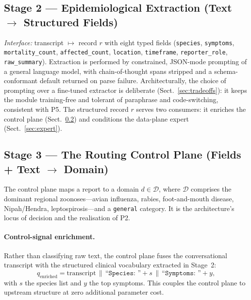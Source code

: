 \documentclass[runningheads]{llncs}
\begin{document}
\subsection{Stage 2 --- Epidemiological Extraction (Text $\rightarrow$ Structured Fields)}

\emph{Interface:} transcript $\mapsto$ record $r$ with eight typed fields
(\texttt{species}, \texttt{symptoms}, \texttt{mortality\_count}, \texttt{affected\_count},
\texttt{location}, \texttt{timeframe}, \texttt{reporter\_role}, \texttt{raw\_summary}).
Extraction is performed by constrained, JSON-mode prompting of a general language model, with chain-of-thought spans stripped and a schema-conformant default returned on parse failure. Architecturally, the choice of prompting over a fine-tuned extractor is deliberate (Sect.~\ref{sec:tradeoffs}): it keeps the module training-free and tolerant of paraphrase and code-switching, consistent with P5. The structured record $r$ serves two consumers: it enriches the control plane (Sect.~\ref{sec:control}) and conditions the data-plane expert (Sect.~\ref{sec:expert}).

\subsection{Stage 3 --- The Routing Control Plane (Fields + Text $\rightarrow$ Domain)}
\label{sec:control}

The control plane maps a report to a domain $d \in \mathcal{D}$, where $\mathcal{D}$ comprises the dominant regional zoonoses---avian influenza, rabies, foot-and-mouth disease, Nipah/Hendra, leptospirosis---and a \texttt{general} category. It is the architecture's locus of decision and the realisation of P2.

\paragraph{Control-signal enrichment.}
Rather than classifying raw text, the control plane fuses the conversational transcript with the structured clinical vocabulary extracted in Stage~2:
\begin{equation}
q_{\text{enriched}} = \text{transcript} \,\|\, \texttt{``Species: ''}{+}s \,\|\, \texttt{``Symptoms: ''}{+}y,
\end{equation}
with $s$ the species list and $y$ the top symptoms. This couples the control plane to upstream structure at zero additional parameter cost.
\end{document}
